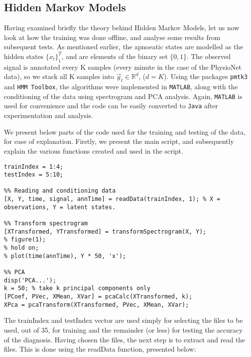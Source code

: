 \subsection{Hidden Markov Models}

Having examined briefly the theory behind Hidden Markov Models, let us now look at how the training was done offline, and analyse some results from subsequent tests. As mentioned earlier, the apnoeatic states are modelled as the hidden states $\{x_t\}_1^T$, and are elements of the binary set $\{0, 1\}$. The observed signal is annotated every K samples (every minute in the case of the PhysioNet data), so we stack all K samples into $\vec y_t \in \mathbb{R}^d$, ($d = K$). Using the packages \verb!pmtk3! and \verb!HMM Toolbox!, the algorithms were implemented in \verb!MATLAB!\textsuperscript{\textregistered}, along with the conditioning of the data using spectrogram and PCA analysis. Again, \verb!MATLAB!\textsuperscript{\textregistered} is used for convenience and the code can be easily converted to \verb!Java! after experimentation and analysis.

We present below parts of the code used for the training and testing of the data, for ease of explanation. Firstly, we present the main script, and subsequently explain the various functions created and used in the script.

\begin{lstlisting}
trainIndex = 1:4;
testIndex = 5:10;

%% Reading and conditioning data
[X, Y, time, signal, annTime] = readData(trainIndex, 1); % X = observations, Y = latent states.

%% Transform spectrogram
[XTransformed, YTransformed] = transformSpectrogram(X, Y);
% figure(1);
% hold on;
% plot(time(annTime), Y * 50, 'x');

%% PCA
disp('PCA...');
k = 50; % take k principal components only
[PCoef, PVec, XMean, XVar] = pcaCalc(XTransformed, k);
XPca = pcaTransform(XTransformed, PVec, XMean, XVar);
\end{lstlisting}

The trainIndex and testIndex vector are used simply for selecting the files to be used, out of 35, for training and the remainder (or less) for testing the accuracy of the diagnosis. Having chosen the files, the next step is to extract and read the files. This is done using the readData function, presented below:

